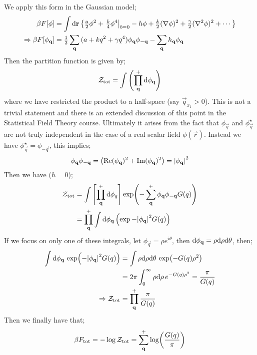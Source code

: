 We apply this form in the Gaussian model;
\begin{align*}
\beta F[\phi] &= \int{\upd{\vec{r}}\set{\tfrac{a}{2}\phi^2 + \left.\tfrac{b}{4}\phi^4\right|_{b = 0} - h\phi + \tfrac{k}{2}(\nabla\phi)^2 + \tfrac{\gamma}{2}(\nabla^2 \phi)^2 + \cdots}} \\
\Rightarrow \beta F[\phi_{\vec{q}}] &= \tfrac{1}{2}\sum_{\vec{q}}{(a + kq^2 + \gamma q^4)\phi_{\vec{q}}\phi_{-\vec{q}}} - \sum_{\vec{q}}{h_{\vec{q}}\phi_{\vec{q}}}
\end{align*}
Then the partition function is given by;
\begin{equation*}
\mZ_{\text{tot}} = \int{\left(\prod_{\vec{q}}^{+}{\ud \phi_{\vec{q}}}\right)}
\end{equation*}
where we have restricted the product to a half-space (say $\vec{q}_{x_1} > 0$). This is not a trivial statement and there is an extended discussion of this point in the Statistical Field Theory course. Ultimately it arises from the fact that $\phi_{\vec{q}}$ and $\phi_{\vec{q}}^{\star}$ are not truly independent in the case of a real scalar field $\phi(\vec{r})$. Instead we have $\phi^{\star}_{\vec{q}} = \phi_{-\vec{q}}$, this implies;
\begin{equation*}
\phi_{\vec{q}}\phi_{-\vec{q}} = \left(\text{Re}(\phi_{\vec{q}})^2 + \text{Im}(\phi_{\vec{q}})^2\right) = \abs{\phi_{\vec{q}}}^2
\end{equation*}
Then we have ($h = 0$);
\begin{align*}
\mZ_{\text{tot}} &= \int{\left[\prod_{\vec{q}}^{+}{\ud \phi_{q}}\right]\exp\left(-\sum_{\vec{q}}^{+}{\phi_{\vec{q}}\phi_{-\vec{q}}G(q)}\right)} \\
&= \prod_{\vec{q}}^{+}{\int{\upd{\phi_{\vec{q}}}\left(\exp-\abs{\phi_{\vec{q}}}^2 G(q)\right)}}
\end{align*}
If we focus on only one of these integrals, let $\phi_{\vec{q}} = \rho e^{i\theta}$, then $\text{d} \phi_{\mathbf{q}} = \rho\text{d} \rho \text{d} \theta$, then;
\begin{align*}
\int{\upd{\phi_{\vec{q}}} \exp\left(-\abs{\phi_{\vec{q}}}^2G(q)\right)} &= \int{\rho \ud \rho \upd{\theta} \exp\left(-G(q)\rho^2\right)} \\
&= 2\pi \int_{0}^{\infty}{\rho \upd{\rho}e^{-G(q)\rho^2}} = \frac{\pi}{G(q)} \\
\Rightarrow \mZ_{\text{tot}} &= \prod_{\vec{q}}^{+}{\frac{\pi}{G(q)}}
\end{align*}
Then we finally have that;
\begin{equation}
\beta F_{\text{tot}} = -\log \mZ_{\text{tot}} = \sum_{\vec{q}}^{+}{\log\left(\frac{G(q)}{\pi}\right)}
\end{equation}
